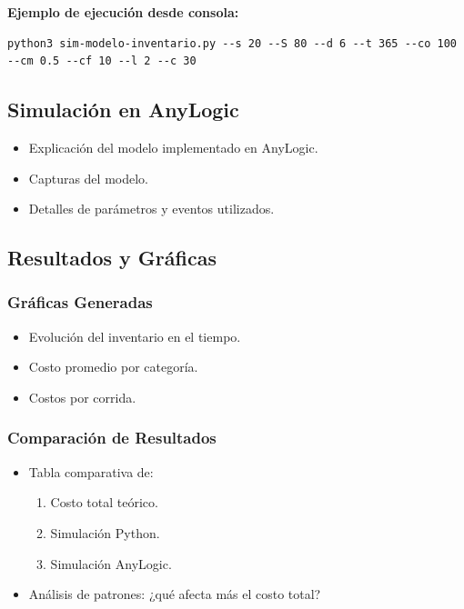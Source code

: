 \documentclass[12pt]{article}
\begin{document}
\textbf{Ejemplo de ejecución desde consola:}
\begin{verbatim}
python3 sim-modelo-inventario.py --s 20 --S 80 --d 6 --t 365 --co 100 --cm 0.5 --cf 10 --l 2 --c 30
\end{verbatim}


\subsection{Simulación en AnyLogic}
\begin{itemize}
    \item Explicación del modelo implementado en AnyLogic.
    \item Capturas del modelo.
    \item Detalles de parámetros y eventos utilizados.
\end{itemize}

\subsection{Resultados y Gráficas}
\subsubsection*{Gráficas Generadas}
\begin{itemize}
    \item Evolución del inventario en el tiempo.
    \item Costo promedio por categoría.
    \item Costos por corrida.
\end{itemize}

\subsubsection*{Comparación de Resultados}
\begin{itemize}
    \item Tabla comparativa de:
    \begin{enumerate}
        \item Costo total teórico.
        \item Simulación Python.
        \item Simulación AnyLogic.
    \end{enumerate}
    \item Análisis de patrones: ¿qué afecta más el costo total?
\end{itemize}
\end{document}
